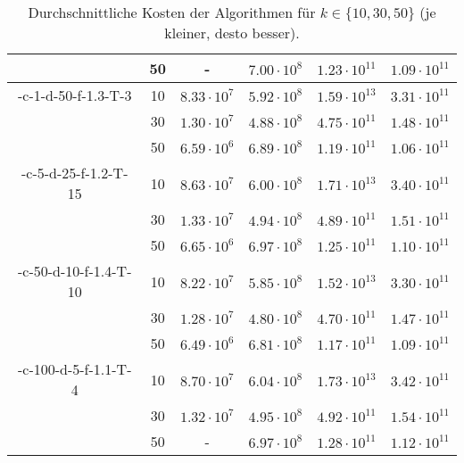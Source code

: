 \begin{table}[h]
\begin{tabular}{@{}cccccc@{}}
		 						& 50 & - 				& $7.00 \cdot 10^8$	& $1.23 \cdot 10^{11}$ & $1.09 \cdot 10^{11}$ \\
	\midrule
	\CsTwo-c-1-d-50-f-1.3-T-3	& 10 & $8.33 \cdot 10^7$ & $5.92 \cdot 10^8$ & $1.59 \cdot 10^{13}$ & $3.31 \cdot 10^{11}$ \\
			 					& 30 & $1.30 \cdot 10^7$ & $4.88 \cdot 10^8$ & $4.75 \cdot 10^{11}$ & $1.48 \cdot 10^{11}$ \\
		 						& 50 & $6.59 \cdot 10^6$ & $6.89 \cdot 10^8$ & $1.19 \cdot 10^{11}$ & $1.06 \cdot 10^{11}$ \\
	\midrule
	\CsTwo-c-5-d-25-f-1.2-T-15	& 10 & $8.63 \cdot 10^7$ & $6.00 \cdot 10^8$ & $1.71 \cdot 10^{13}$ & $3.40 \cdot 10^{11}$ \\
			 					& 30 & $1.33 \cdot 10^7$ & $4.94 \cdot 10^8$ & $4.89 \cdot 10^{11}$ & $1.51 \cdot 10^{11}$ \\
		 						& 50 & $6.65 \cdot 10^6$ & $6.97 \cdot 10^8$ & $1.25 \cdot 10^{11}$ & $1.10 \cdot 10^{11}$ \\
	\midrule
	\CsTwo-c-50-d-10-f-1.4-T-10	& 10 & $8.22 \cdot 10^7$ & $5.85 \cdot 10^8$ & $1.52 \cdot 10^{13}$ & $3.30 \cdot 10^{11}$ \\
			 					& 30 & $1.28 \cdot 10^7$ & $4.80 \cdot 10^8$ & $4.70 \cdot 10^{11}$ & $1.47 \cdot 10^{11}$ \\
		 						& 50 & $6.49 \cdot 10^6$ & $6.81 \cdot 10^8$ & $1.17 \cdot 10^{11}$ & $1.09 \cdot 10^{11}$ \\
	\midrule
	\CsTwo-c-100-d-5-f-1.1-T-4	& 10 & $8.70 \cdot 10^7$ & $6.04 \cdot 10^8$ & $1.73 \cdot 10^{13}$ & $3.42 \cdot 10^{11}$ \\
			 					& 30 & $1.32 \cdot 10^7$ & $4.95 \cdot 10^8$ & $4.92 \cdot 10^{11}$ & $1.54 \cdot 10^{11}$ \\
		 						& 50 & - 				& $6.97 \cdot 10^8$ & $1.28 \cdot 10^{11}$ & $1.12 \cdot 10^{11}$ \\
	\bottomrule
\end{tabular}
\caption{Durchschnittliche Kosten der Algorithmen für $k \in \{ 10, 30, 50 \}$ (je kleiner, desto besser).}
\label{tbl:experiment-coresets-costs}
\end{table}
\newpage
